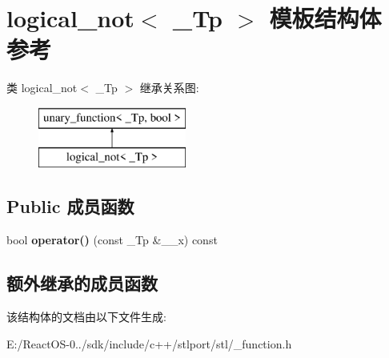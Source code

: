 \hypertarget{structlogical__not}{}\section{logical\+\_\+not$<$ \+\_\+\+Tp $>$ 模板结构体 参考}
\label{structlogical__not}
类 logical\+\_\+not$<$ \+\_\+\+Tp $>$ 继承关系图\+:\begin{figure}[H]
\begin{center}
\leavevmode
\includegraphics[height=2.000000cm]{structlogical__not}
\end{center}
\end{figure}
\subsection*{Public 成员函数}
\begin{DoxyCompactItemize}
\item 
\mbox{\label{structlogical__not_a7d05932fa5260cc3cf05c149124697be}} 
bool {\bfseries operator()} (const \+\_\+\+Tp \&\+\_\+\+\_\+x) const
\end{DoxyCompactItemize}
\subsection*{额外继承的成员函数}


该结构体的文档由以下文件生成\+:\begin{DoxyCompactItemize}
\item 
E\+:/\+React\+O\+S-\/0../sdk/include/c++/stlport/stl/\+\_\+function.\+h\end{DoxyCompactItemize}
